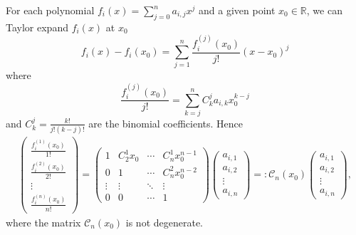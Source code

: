 \documentclass{article}
\begin{document}
For each polynomial $f_{i}(x)=\sum_{j=0}^{n}a_{i,j}x^{j}$ and a given point $x_{0}\in \mathbb{R}$, we can Taylor expand $f_{i}(x)$ at $x_{0}$
\begin{equation*}
    f_{i}(x)-f_{i}(x_{0})=\sum_{j=1}^{n}\frac{f_{i}^{(j)}(x_{0})}{j!}(x-x_{0})^{j}
\end{equation*}
where
\begin{equation}\label{2a1}
    \frac{f_{i}^{(j)}(x_{0})}{j!}=\sum_{k=j}^{n}C_{k}^{j}a_{i, k}x_{0}^{k-j}
\end{equation}
and $C_{k}^{j}=\frac{k!}{j!(k-j)!}$ are the binomial coefficients. Hence
\begin{eqnarray*}
    \left(\begin{matrix}\frac{f_{i}^{(1)}(x_{0})}{1!} \\ 
    \frac{f_{i}^{(2)}(x_{0})}{2!}\\
    \vdots\\
    \frac{f_{i}^{(n)}(x_{0})}{n!}
    \end{matrix}\right)
    =\left(\begin{matrix}
    1 & C_{2}^{1}x_{0} & \cdots & C_{n}^{1}x_{0}^{n-1} \\ 
    0 & 1 & \cdots & C_{n}^{2}x_{0}^{n-2} \\
    \vdots & \vdots & \ddots &\vdots\\
    0 & 0 & \cdots & 1
    \end{matrix}\right)
    \left(\begin{matrix}a_{i,1} \\ 
    a_{i, 2}\\
    \vdots\\
    a_{i, n}
    \end{matrix}\right)=:\mathcal{C}_{n}(x_{0})\left(\begin{matrix}a_{i,1} \\ 
    a_{i, 2}\\
    \vdots\\
    a_{i, n}
    \end{matrix}\right),
\end{eqnarray*}
where the matrix $\mathcal{C}_{n}(x_{0})$ is not degenerate.
\end{document}
